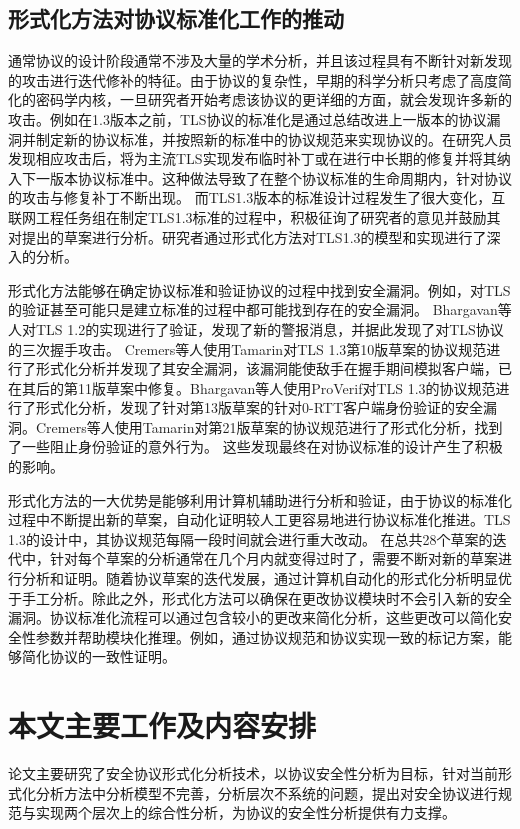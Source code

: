 \subsection{形式化方法对协议标准化工作的推动}
通常协议的设计阶段通常不涉及大量的学术分析，并且该过程具有不断针对新发现的攻击进行迭代修补的特征。由于协议的复杂性，早期的科学分析只考虑了高度简化的密码学内核，一旦研究者开始考虑该协议的更详细的方面，就会发现许多新的攻击\cite{Abdalla2015}。例如在1.3版本之前，TLS协议的标准化是通过总结改进上一版本的协议漏洞并制定新的协议标准，并按照新的标准中的协议规范来实现协议的。在研究人员发现相应攻击后，将为主流TLS实现发布临时补丁或在进行中长期的修复并将其纳入下一版本协议标准中。这种做法导致了在整个协议标准的生命周期内，针对协议的攻击与修复补丁不断出现。
而TLS1.3版本的标准设计过程发生了很大变化，互联网工程任务组在制定TLS1.3标准的过程中，积极征询了研究者的意见并鼓励其对提出的草案进行分析。研究者通过形式化方法对TLS1.3的模型和实现进行了深入的分析。

形式化方法能够在确定协议标准和验证协议的过程中找到安全漏洞。例如，对TLS的验证甚至可能只是建立标准的过程中都可能找到存在的安全漏洞。 Bhargavan等人对TLS 1.2的实现进行了验证\cite{Bhargavan2013}，发现了新的警报消息，并据此发现了对TLS协议的三次握手攻击\cite{Bhargavan2014}。 Cremers等人使用Tamarin对TLS 1.3第10版草案的协议规范进行了形式化分析并发现了其安全漏洞\cite{2016Automated}，该漏洞能使敌手在握手期间模拟客户端，已在其后的第11版草案中修复。Bhargavan等人使用ProVerif对TLS 1.3的协议规范进行了形式化分析，发现了针对第13版草案的针对0-RTT客户端身份验证的安全漏洞\cite{2017Verified}。Cremers等人使用Tamarin对第21版草案的协议规范进行了形式化分析，找到了一些阻止身份验证的意外行为\cite{cremers2017comprehensive}。 这些发现最终在对协议标准的设计产生了积极的影响。

形式化方法的一大优势是能够利用计算机辅助进行分析和验证，由于协议的标准化过程中不断提出新的草案，自动化证明较人工更容易地进行协议标准化推进。TLS 1.3的设计中，其协议规范每隔一段时间就会进行重大改动。
在总共28个草案的迭代中，针对每个草案的分析通常在几个月内就变得过时了，需要不断对新的草案进行分析和证明。随着协议草案的迭代发展，通过计算机自动化的形式化分析明显优于手工分析。除此之外，形式化方法可以确保在更改协议模块时不会引入新的安全漏洞。协议标准化流程可以通过包含较小的更改来简化分析，这些更改可以简化安全性参数并帮助模块化推理。例如，通过协议规范和协议实现一致的标记方案，能够简化协议的一致性证明。 


\section{本文主要工作及内容安排}
论文主要研究了安全协议形式化分析技术，以协议安全性分析为目标，针对当前形式化分析方法中分析模型不完善，分析层次不系统的问题，提出对安全协议进行规范与实现两个层次上的综合性分析，为协议的安全性分析提供有力支撑。

